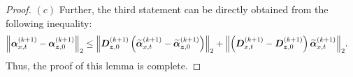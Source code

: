 \begin{proof}



  $(c)$ Further, the third statement can be directly obtained from the following inequality:
  \begin{align*}
    \norm{{\bm{\alpha}}^{(k+1)}_{x,t} -{\bm{\alpha}}^{(k+1)}_{\bm{z},0}}_2 &\leq \norm{\bm{D}^{(k+1)}_{{\bm{z}},0}\left(\widetilde{\bm{\alpha}}^{(k+1)}_{x,t} - \widetilde{\bm{\alpha}}^{(k+1)}_{\bm{z},0}\right)}_2+\norm{\left(\bm{D}^{(k+1)}_{x,t} - \bm{D}^{(k+1)}_{{\bm{z}},0} \right)\widetilde{\bm{\alpha}}^{(k+1)}_{x,t} }_2.
  \end{align*}
  Thus, the proof of this lemma is complete.
\end{proof}

